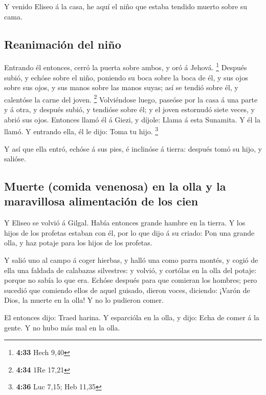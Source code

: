  Y venido Eliseo á la casa, he aquí el niño que estaba
tendido muerto sobre su cama.

\hypertarget{reanimaciuxf3n-del-niuxf1o}{%
\subsection{Reanimación del niño}\label{reanimaciuxf3n-del-niuxf1o}}

 Entrando él entonces, cerró la puerta sobre ambos, y oró
á Jehová. \footnote{\textbf{4:33} Hech 9,40}  Después
subió, y echóse sobre el niño, poniendo su boca sobre la boca de él, y
sus ojos sobre sus ojos, y sus manos sobre las manos suyas; así se
tendió sobre él, y calentóse la carne del joven. \footnote{\textbf{4:34}
  1Re 17,21}  Volviéndose luego, paseóse por la casa á
una parte y á otra, y después subió, y tendióse sobre él; y el joven
estornudó siete veces, y abrió sus ojos.  Entonces llamó
él á Giezi, y díjole: Llama á esta Sunamita. Y él la llamó. Y entrando
ella, él le dijo: Toma tu hijo. \footnote{\textbf{4:36} Luc 7,15; Heb
  11,35}

 Y así que ella entró, echóse á sus pies, é inclinóse á
tierra: después tomó su hijo, y salióse.

\hypertarget{muerte-comida-venenosa-en-la-olla-y-la-maravillosa-alimentaciuxf3n-de-los-cien}{%
\subsection{Muerte (comida venenosa) en la olla y la maravillosa
alimentación de los
cien}\label{muerte-comida-venenosa-en-la-olla-y-la-maravillosa-alimentaciuxf3n-de-los-cien}}

 Y Eliseo se volvió á Gilgal. Había entonces grande
hambre en la tierra. Y los hijos de los profetas estaban con él, por lo
que dijo á su criado: Pon una grande olla, y haz potaje para los hijos
de los profetas.

 Y salió uno al campo á coger hierbas, y halló una como
parra montés, y cogió de ella una faldada de calabazas silvestres: y
volvió, y cortólas en la olla del potaje: porque no sabía lo que era.
 Echóse después para que comieran los hombres; pero
sucedió que comiendo ellos de aquel guisado, dieron voces, diciendo:
¡Varón de Dios, la muerte en la olla! Y no lo pudieron comer.

 El entonces dijo: Traed harina. Y esparcióla en la olla,
y dijo: Echa de comer á la gente. Y no hubo más mal en la olla.

